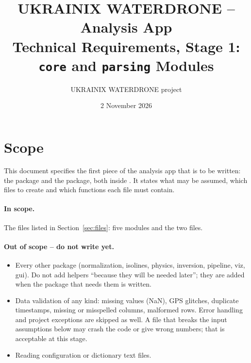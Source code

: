 \documentclass{article}
\title{UKRAINIX WATERDRONE -- Analysis App\\[2mm]
       Technical Requirements, Stage 1:\\[1mm]
       \texttt{core} and \texttt{parsing} Modules}
\author{UKRAINIX WATERDRONE project}
\date{2 November 2026}
\begin{document}
\maketitle

\section{Scope}

This document specifies the first piece of the analysis app that is to be
written: the  package and the  package, both inside
. It states what may be assumed, which
files to create and which functions each file must contain.

\paragraph{In scope.}
The files listed in Section~\ref{sec:files}: five modules and the two
 files.

\paragraph{Out of scope -- do not write yet.}
\begin{itemize}
\item Every other package (normalization, isolines, physics, inversion,
      pipeline, viz, gui). Do not add helpers ``because they will be needed
      later''; they are added when the package that needs them is written.
\item Data validation of any kind: missing values (NaN), GPS glitches,
      duplicate timestamps, missing or misspelled columns, malformed rows.
      Error handling and project exceptions are skipped as well. A file
      that breaks the input assumptions below may crash the code or give
      wrong numbers; that is acceptable at this stage.
\item Reading configuration or dictionary text files.
\end{itemize}
\end{document}
